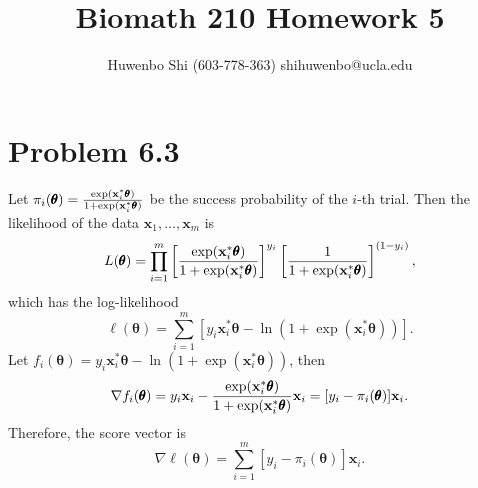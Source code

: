 \documentclass{scrartcl}
\begin{document}

\newcommand*{\TitleFont}{
      \usefont{\encodingdefault}{\rmdefault}{b}{n}
      \fontsize{16}{20}
      \selectfont}
\newcommand*{\AuthorFont}{
      \usefont{\encodingdefault}{\rmdefault}{r}{n}
      \fontsize{12}{20}
      \selectfont}
\title{\TitleFont Biomath 210 Homework 5}
\author{\AuthorFont Huwenbo Shi (603-778-363) shihuwenbo@ucla.edu}
\maketitle

\newcommand*{\argmin}{\operatornamewithlimits{argmin}\limits}
\newcommand*{\argmax}{\operatornamewithlimits{argmax}\limits}
\newcommand{\tr}{\mathrm{tr}}
\newcommand{\dom}{\mathrm{dom}}
\newcommand{\E}{\mathrm{E}}
\newcommand{\prox}{\mathrm{prox}}
\newcommand{\epi}{\mathrm{epi}}
\def\mb#1{\mathbf{#1}}


\section*{Problem 6.3}

Let $\pi_i(\pmb{\theta}) = {\exp(\mb{x}_i^*\pmb{\theta}) \over {1 + \exp(\mb{x}_i^*\pmb{\theta})}}$ be the success probability of the $i$-th trial. Then the likelihood
of the data $\mb{x}_1, \dotsc, \mb{x}_m$ is
\begin{equation}
    L(\pmb{\theta}) = \prod_{i=1}^m \left[ {\exp(\mb{x}_i^*\pmb{\theta}) \over {1 + \exp(\mb{x}_i^*\pmb{\theta})}} \right]^{y_i}
                                    \left[ {1 \over {1 + \exp(\mb{x}_i^*\pmb{\theta})}} \right]^{(1-y_i)},
\end{equation}
which has the log-likelihood
\begin{equation}
    \ell(\pmb{\theta}) = \sum_{i=1}^m [y_i \mb{x}_i^*\pmb{\theta} - \ln(1 + \exp(\mb{x}_i^*\pmb{\theta})) ].
\end{equation}
Let $f_i(\pmb{\theta}) = y_i \mb{x}_i^*\pmb{\theta} - \ln(1 + \exp(\mb{x}_i^*\pmb{\theta}))$, then
\begin{equation}
\nabla f_i(\pmb{\theta}) = y_i \mb{x}_i - {\exp(\mb{x}_i^*\pmb{\theta}) \over {1 + \exp(\mb{x}_i^*\pmb{\theta})}} \mb{x}_i
                                        = [y_i-\pi_i(\pmb{\theta})] \mb{x}_i .
\end{equation}
Therefore, the score vector is
\begin{equation}
\nabla \ell(\pmb{\theta}) = \sum_{i=1}^m [y_i-\pi_i(\pmb{\theta})] \mb{x}_i.
\end{equation}
\end{document}
